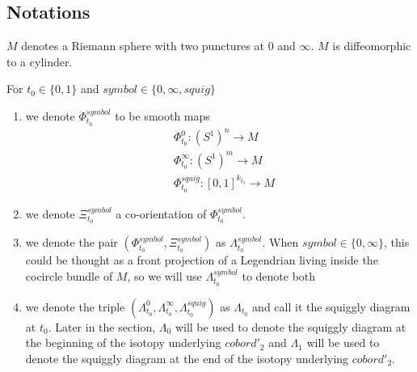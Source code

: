 \subsection*{Notations}
\begin{definition}
$M$ denotes a Riemann sphere with two punctures at $0$ and $\infty$. $M$ is diffeomorphic to a cylinder.
\end{definition}
\begin{definition}
For $t_0\in\{0,1\}$ and $symbol\in\{0,\infty, squig \}$
\begin{enumerate}
\item we denote $\Phi_{t_0}^{symbol}$ to be smooth maps
\begin{align*}
&\Phi_{t_0}^0 : (S^1)^n \rightarrow M \\
&\Phi_{t_0}^\infty : (S^1)^m \rightarrow M \\
&\Phi_{t_0}^{squig} : [0,1]^{k_{t_0}} \rightarrow M
\end{align*}

\item we denote $\Xi_{t_0}^{symbol}$ a co-orientation of $\Phi_{t_0}^{symbol}$.

\item we denote the pair $(\Phi_{t_0}^{symbol},\Xi_{t_0}^{symbol})$ as $\Lambda_{t_0}^{symbol}$. When $symbol \in \{0,\infty\}$, this could be thought as a front projection of a Legendrian living inside the cocircle bundle of $M$, so we will use $\Lambda_{t_0}^{symbol}$ to denote both

\item we denote the triple $(\Lambda_{t_0}^{0},\Lambda_{t_0}^{\infty},\Lambda_{t_0}^{squig})$ as $\Lambda_{t_0}$ and call it the squiggly diagram at $t_0$. Later in the section, $\Lambda_0$ will be used to denote the squiggly diagram at the beginning of the isotopy underlying $cobord'_2$ and $\Lambda_1$ will be used to denote the squiggly diagram at the end of the isotopy underlying $cobord'_2$. 
\end{enumerate}
\end{definition}

